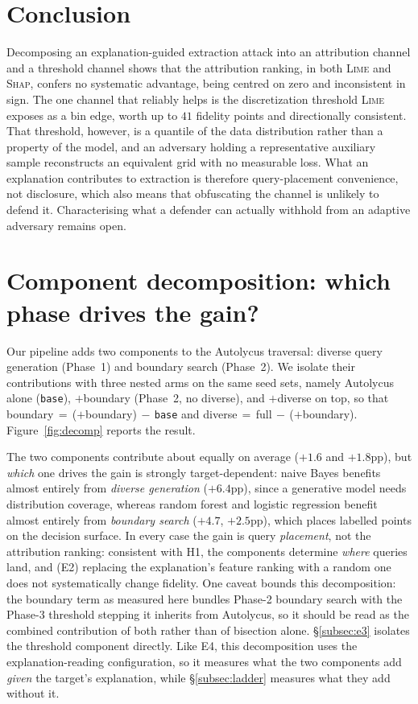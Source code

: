 \documentclass[sigconf,anonymous,review]{acmart}
\begin{document}
\section{Conclusion}
Decomposing an explanation-guided extraction attack into an attribution channel and a threshold channel
shows that the attribution ranking, in both \textsc{Lime} and \textsc{Shap}, confers no systematic
advantage, being centred on zero and inconsistent in sign. The one channel that reliably helps is the
discretization threshold \textsc{Lime} exposes as a bin edge, worth up to $41$ fidelity points and
directionally consistent. That threshold, however, is a quantile of the data distribution rather than a
property of the model, and an adversary holding a representative auxiliary sample reconstructs an
equivalent grid with no measurable loss. What an explanation contributes to extraction is therefore
query-placement convenience, not disclosure, which also means that obfuscating the channel is unlikely
to defend it. Characterising what a defender can actually withhold from an adaptive adversary remains
open.

\appendix

\section{Component decomposition: which phase drives the gain?}
\label{app:decomp}
\label{subsec:e1}
Our pipeline adds two components to the Autolycus traversal: diverse query generation (Phase~1) and
boundary search (Phase~2). We isolate their contributions with three nested arms on the same seed sets, namely Autolycus alone (\texttt{base}), $+$boundary (Phase~2, no diverse), and $+$diverse on top, so that boundary$\,=\,$($+$boundary)$\,-\,$\texttt{base} and
diverse$\,=\,$full$\,-\,$($+$boundary). Figure~\ref{fig:decomp} reports the result.

The two components contribute about equally on average ($+1.6$ and $+1.8$pp), but \emph{which} one
drives the gain is strongly target-dependent: naive Bayes benefits almost entirely from
\emph{diverse generation} ($+6.4$pp), since a generative model needs distribution coverage, whereas random forest and logistic regression benefit almost entirely from \emph{boundary search}
($+4.7$, $+2.5$pp), which places labelled points on the decision surface. In every case the gain is
query \emph{placement}, not the attribution ranking: consistent with H1, the components determine
\emph{where} queries land, and (E2) replacing the explanation's feature ranking with a random one
does not systematically change fidelity. One caveat bounds this decomposition: the boundary term as
measured here bundles Phase-2 boundary search with the Phase-3 threshold stepping it inherits from
Autolycus, so it should be read as the combined contribution of both rather than of bisection alone.
\S\ref{subsec:e3} isolates the threshold component directly. Like E4, this decomposition uses the
explanation-reading configuration, so it measures what the two components add \emph{given} the
target's explanation, while \S\ref{subsec:ladder} measures what they add without it.
\end{document}
